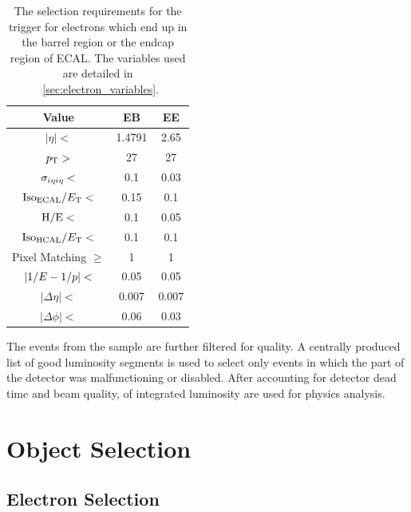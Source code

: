 \begin{table}[h]
\centering
\begin{center}
    \begin{tabular}{ | c | c c |} \hline
        Value                      & EB     & EE     \\ \hline
        $|\eta| <$                 & 1.4791 & 2.65   \\
        $p_{\mathrm{T}} >$                    & 27     & 27     \\
        $\sigma_{i \eta i \eta} <$         & 0.1    & 0.03   \\
        $\text{Iso}_{\text{ECAL}} / E_{\mathrm{T}} <$         & 0.15   & 0.1    \\
        $\text{H}/\text{E} <$                & 0.1    & 0.05   \\
        $\text{Iso}_{\text{HCAL}} / E_{\mathrm{T}} <$         & 0.1    & 0.1    \\
        Pixel Matching $\ge$       & 1      & 1      \\
        $|1/E - 1/p| <$              & 0.05   & 0.05   \\
        $|\Delta \eta| <$          & 0.007  & 0.007  \\
        $|\Delta \phi| <$          & 0.06   & 0.03   \\ \hline
    \end{tabular}
\end{center}
\caption{
    The selection requirements for the \SingleElectronTrigger trigger for
    electrons which end up in the barrel region or the endcap region of ECAL.
    The variables used are detailed in \SEC~\ref{sec:electron_variables}.
}
\label{table:wp80}
\end{table}

The events from the \SingleElectron sample are further filtered for quality. A
centrally produced list of good luminosity segments is used to select only
events in which the part of the detector was malfunctioning or disabled. After
accounting for detector dead time and beam quality, \GoodLumiNumber of
integrated luminosity are used for physics analysis.

\section{Object Selection}

\subsection{Electron Selection}
\label{ssec:electron_selection}

